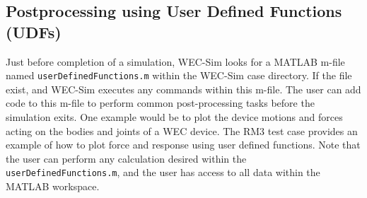 \subsection{Postprocessing using User Defined Functions (UDFs)}
Just before completion of a simulation, WEC-Sim looks for a MATLAB m-file named \texttt{userDefinedFunctions.m} within the WEC-Sim case directory. If the file exist, and WEC-Sim executes any commands within this m-file. The user can add code to this m-file to perform common post-processing tasks before the simulation exits. One example would be to plot the device motions and forces acting on the bodies and joints of a WEC device. The RM3 test case provides an example of how to plot force and response using user defined functions. Note that the user can perform any calculation desired within the \texttt{userDefinedFunctions.m}, and the user has access to all data within the MATLAB workspace.
